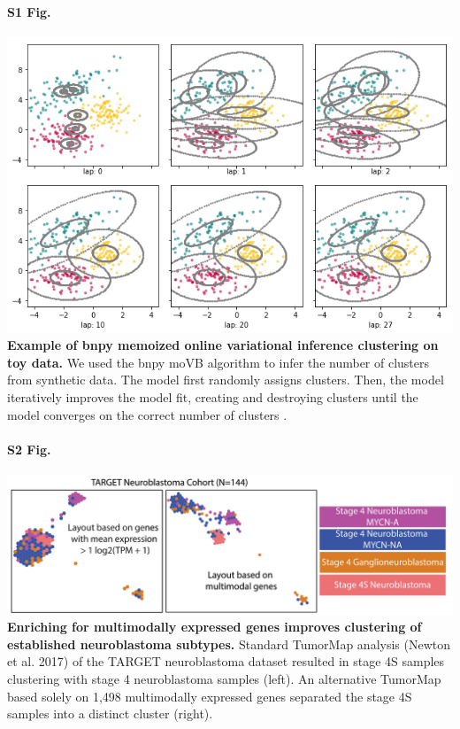 \documentclass[10pt,letterpaper]{article}
\begin{document}
\paragraph*{S1 Fig.}
\includegraphics[width=\textwidth]{img/PNG/bnpy-example-fit}
\label{S1_Fig}
{\bf Example of bnpy memoized online variational inference clustering on toy data.} We used the bnpy moVB algorithm to infer the number of clusters from synthetic data. The model first randomly assigns clusters. Then, the model iteratively improves the model fit, creating and destroying clusters until the model converges on the correct number of clusters \cite{hughesBnpyReliableScalable}. 

\paragraph*{S2 Fig.}
\includegraphics[width=\textwidth]{img/PNG/TumorMap-NBL-MM-V3-2x}
\label{S2_Fig}
{\bf Enriching for multimodally expressed genes improves clustering of established neuroblastoma subtypes.} Standard TumorMap analysis (Newton et al. 2017) of the TARGET neuroblastoma dataset resulted in stage 4S samples clustering with stage 4 neuroblastoma samples (left). An alternative TumorMap based solely on 1,498 multimodally expressed genes separated the stage 4S samples into a distinct cluster (right).
\end{document}
